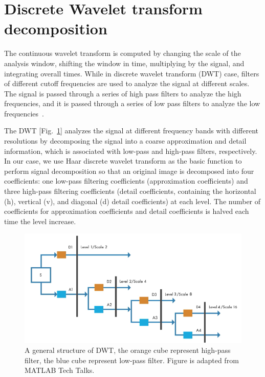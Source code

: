\section{Discrete Wavelet transform decomposition}
\label{sec:dwt}
The continuous wavelet transform is computed by changing the scale of the analysis window, shifting the window in time, multiplying by the signal, and integrating overall times. While in discrete wavelet transform (DWT) case, filters of different cutoff frequencies are used to analyze the signal at different scales. The signal is passed through a series of high pass filters to analyze the high frequencies, and it is passed through a series of low pass filters to analyze the low frequencies~\cite{polikar1996wavelet}.


The DWT [Fig.~\ref{fig:dwt}] analyzes the signal at different frequency bands with different resolutions by decomposing the signal into a coarse approximation and detail information, which is associated with low-pass and high-pass filters, respectively. In our case, we use Haar discrete wavelet transform as the basic function to perform signal decomposition so that an original image is decomposed into four coefficients: one low-pass filtering coefficients (approximation coefficients) and three high-pass filtering coefficients (detail coefficients, containing the horizontal (h), vertical (v), and diagonal (d) detail coefficients) at each level. The number of coefficients for approximation coefficients and detail coefficients is halved each time the level increase.



\begin{figure}[h]
\centering
\includegraphics[width=1\textwidth]{images/dwt.png}
\caption[Structure of CNNs]{A general structure of DWT, the orange cube represent high-pass filter, the blue cube represent low-pass filter. Figure is adapted from MATLAB Tech Talks.}
\label{fig:dwt}
\end{figure}


